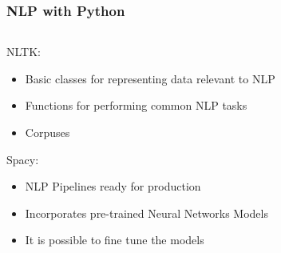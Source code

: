 \documentclass{beamer}
\begin{document}
\begin{frame}

\frametitle{NLP with Python}

	\begin{columns}
	
	\begin{column}{.5\textwidth}
	
	NLTK:
	
	\small
		\begin{itemize}
			\item Basic classes for representing data relevant to NLP
			
			\item Functions for performing common NLP tasks
			
			\item Corpuses
			
		\end{itemize}
	
	\normalsize
	Spacy:
	
	\small
		\begin{itemize}
			
			\item NLP Pipelines ready for production
			
			\item Incorporates pre-trained Neural Networks Models
			
			\item It is possible to fine tune the models
			
		\end{itemize}

	\end{column}
	

\end{columns}
\end{frame}
\end{document}
